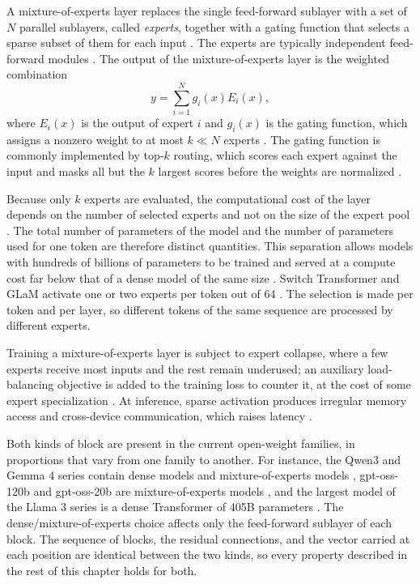 A mixture-of-experts layer replaces the single feed-forward sublayer with a set of $N$ parallel sublayers, called \emph{experts}, together with a gating function that selects a sparse subset of them for each input \cite{zhangMixtureExpertsLarge2025}. The experts are typically independent feed-forward modules \cite{zhangMixtureExpertsLarge2025}. The output of the mixture-of-experts layer is the weighted combination
\begin{equation}
    y = \sum_{i=1}^{N} g_i(x) E_i(x) ,
\end{equation}
where $E_i(x)$ is the output of expert $i$ and $g_i(x)$ is the gating function, which assigns a nonzero weight to at most $k \ll N$ experts \cite{zhangMixtureExpertsLarge2025}. The gating function is commonly implemented by top-$k$ routing, which scores each expert against the input and masks all but the $k$ largest scores before the weights are normalized \cite{zhangMixtureExpertsLarge2025}.

Because only $k$ experts are evaluated, the computational cost of the layer depends on the number of selected experts and not on the size of the expert pool \cite{zhangMixtureExpertsLarge2025}. The total number of parameters of the model and the number of parameters used for one token are therefore distinct quantities. This separation allows models with hundreds of billions of parameters to be trained and served at a compute cost far below that of a dense model of the same size \cite{zhangMixtureExpertsLarge2025}. Switch Transformer and GLaM activate one or two experts per token out of 64 \cite{zhangMixtureExpertsLarge2025}. The selection is made per token and per layer, so different tokens of the same sequence are processed by different experts.

Training a mixture-of-experts layer is subject to expert collapse, where a few experts receive most inputs and the rest remain underused; an auxiliary load-balancing objective is added to the training loss to counter it, at the cost of some expert specialization \cite{zhangMixtureExpertsLarge2025}. At inference, sparse activation produces irregular memory access and cross-device communication, which raises latency \cite{zhangMixtureExpertsLarge2025}.

Both kinds of block are present in the current open-weight families, in proportions that vary from one family to another. For instance, the Qwen3 and Gemma 4 series contain dense models and mixture-of-experts models \cite{yangQwen3TechnicalReport2025, teamGemma4Technical2026}, gpt-oss-120b and gpt-oss-20b are mixture-of-experts models \cite{openaiGptoss120bGptoss20bModel2025}, and the largest model of the Llama 3 series is a dense Transformer of 405B parameters \cite{grattafioriLlama3Herd2024}. The dense/mixture-of-experts choice affects only the feed-forward sublayer of each block. The sequence of blocks, the residual connections, and the vector carried at each position are identical between the two kinds, so every property described in the rest of this chapter holds for both.

